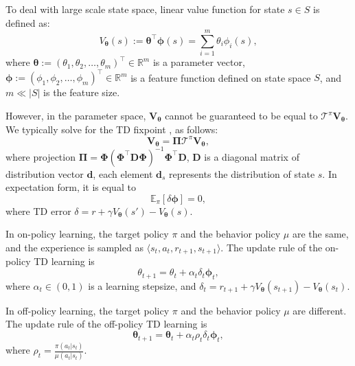   To deal with large scale state space, 
  linear value function for state $s\in S$ is defined as:
\begin{equation}
 V_{{\bm{\theta}}}(s):= {{\bm{\theta}}}^{\top}{{\bm{\phi}}}(s) = \sum_{i=1}^{m}
\theta_i \phi_i(s),
\label{linearvaluefunction}
\end{equation}
 where ${{{\bm{\theta}}}}:=(\theta_1,\theta_2,\ldots,\theta_m)^{\top}\in
 \mathbb{R}^m$ is a parameter vector, 
 ${{\bm{\phi}}}:=(\phi_1,\phi_2,\ldots,\phi_m)^{\top}\in \mathbb{R}^m$ is a feature
 function defined on state space $S$, and $m\ll |S|$ is the feature size. 
 
However, in the parameter space, 
$\bm{V}_{{\bm{\theta}}}$ cannot be guaranteed to be equal to 
$\bm{\mathcal{T}}^{\pi}\bm{V}_{{\bm{\theta}}}$.
 We typically solve for the TD fixpoint \citep{sutton2008convergent,sutton2009fast}, as follows:
 \begin{equation}
  \bm{V}_{{\bm{\theta}}}=\bm{{\bm{\Pi}}}\bm{\mathcal{T}}^{\pi}\bm{V}_{{\bm{\theta}}},
 \end{equation}
 where projection ${\bm{\Pi}}={\bm{\Phi}}({\bm{\Phi}}^{\top}\textbf{D}{\bm{\Phi}})^{-1}{\bm{\Phi}}^{\top}\textbf{D}$, 
 $\textbf{D}$  is a diagonal matrix of distribution vector $\bm{d}$, each element $\bm{d}_{s}$
  represents the distribution of state $s$.
 In expectation form, it is equal to 
 \begin{equation}
 \mathbb{E}_{\pi}[\delta\bm{\phi}]=0,
 \end{equation}
 where TD error  $\delta=r+\gamma V_{\bm{\theta}}(s')-V_{\bm{\theta}}(s)$. 
 
 In on-policy learning, the target policy $\pi$ and the behavior policy $\mu$
  are the same,
  and the experience is sampled %
  as $\langle s_t,a_t,r_{t+1},s_{t+1}\rangle$.
  The update rule of the on-policy TD learning \citep{sutton2016emphatic} is
  \begin{equation}
  \label{td(0)theta}
  \theta_{t+1} = \theta_{t}+\alpha_t\delta_t\bm{\phi}_t,
  \end{equation}
  where $\alpha_t\in (0,1)$ is a learning stepsize,
  and   $\delta_t=r_{t+1}+\gamma V_{\bm{\theta}}(s_{t+1})-V_{\bm{\theta}}(s_t)$.
  
 In off-policy learning, the target policy $\pi$ and the behavior policy $\mu$ are
 different. The update rule of the off-policy TD learning \citep{sutton2016emphatic} is
 \begin{equation}
  \bm{\theta}_{t+1} = \bm{\theta}_{t}+\alpha_t\rho_t\delta_t\bm{\phi}_t,
  \end{equation}
  where $\rho_t=\frac{\pi(a_t|s_t)}{\mu(a_t|s_t)}$.
 


